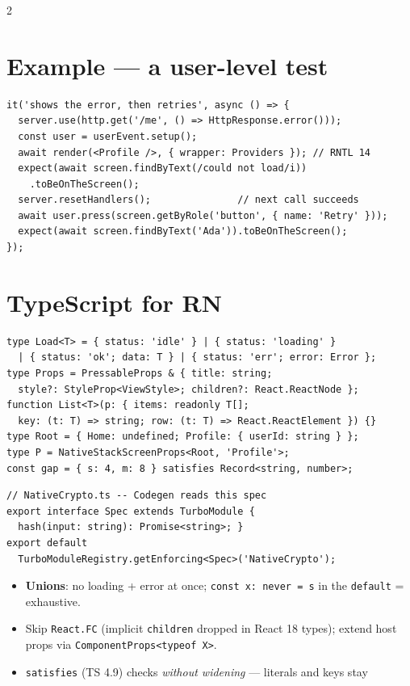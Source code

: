 \documentclass[8pt]{extarticle}
\begin{document}
\begin{multicols}{2}
\section{Example — a user-level test}
\begin{lstlisting}[language=TSSheet]
it('shows the error, then retries', async () => {
  server.use(http.get('/me', () => HttpResponse.error()));
  const user = userEvent.setup();
  await render(<Profile />, { wrapper: Providers }); // RNTL 14
  expect(await screen.findByText(/could not load/i))
    .toBeOnTheScreen();
  server.resetHandlers();               // next call succeeds
  await user.press(screen.getByRole('button', { name: 'Retry' }));
  expect(await screen.findByText('Ada')).toBeOnTheScreen();
});
\end{lstlisting}

\section{TypeScript for RN}
\begin{lstlisting}[language=TSSheet]
type Load<T> = { status: 'idle' } | { status: 'loading' }
  | { status: 'ok'; data: T } | { status: 'err'; error: Error };
type Props = PressableProps & { title: string;
  style?: StyleProp<ViewStyle>; children?: React.ReactNode };
function List<T>(p: { items: readonly T[];
  key: (t: T) => string; row: (t: T) => React.ReactElement }) {}
type Root = { Home: undefined; Profile: { userId: string } };
type P = NativeStackScreenProps<Root, 'Profile'>;
const gap = { s: 4, m: 8 } satisfies Record<string, number>;
\end{lstlisting}
\noindent\begin{minipage}{\linewidth}
\begin{lstlisting}[language=TSSheet]
// NativeCrypto.ts -- Codegen reads this spec
export interface Spec extends TurboModule {
  hash(input: string): Promise<string>; }
export default
  TurboModuleRegistry.getEnforcing<Spec>('NativeCrypto');
\end{lstlisting}
\end{minipage}
\begin{itemize}\raggedright
  \item \textbf{Unions}: no loading + error at once; \texttt{const x: never = s} in the
        \texttt{default} = exhaustive.
  \item Skip \texttt{React.FC} (implicit \texttt{children} dropped in React 18 types); extend
        host props via \texttt{ComponentProps<typeof X>}.
  \item \texttt{satisfies} (TS 4.9) checks \emph{without widening} — literals and keys stay

\end{itemize}
\end{multicols}
\end{document}

